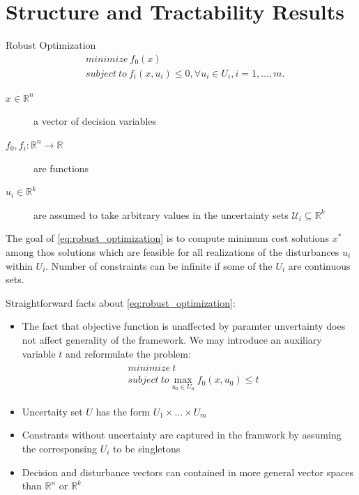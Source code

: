 \documentclass{beamer}
\begin{document}
\section{Structure and Tractability Results}

\begin{frame}{Robust Optimization}
\begin{align}
\label{eq:robust_optimization}
& minimize~f_0(x) \\
& subject~to~f_i(x,u_i) \leq 0, \forall u_i \in U_i, i = 1,\dots,m.
\end{align}
\begin{description}
\item [$x \in \mathbb{R}^n$] a vector of decision variables
\item [$f_0,f_i : \mathbb{R}^n \rightarrow \mathbb{R}$] are functions
\item [$u_i \in \mathbb{R}^k$] are assumed to take arbitrary values in the uncertainty sets $\mathcal{U}_i \subseteq \mathbb{R}^k$
\end{description}
The goal of \ref{eq:robust_optimization} is to compute minimum cost solutions $x^*$ among thos solutions which are feasible for all realizations of the disturbances $u_i$ within $U_i$.
Number of constraints can be infinite if some of the $U_i$ are continuous sets.
\end{frame}

\begin{frame}{}
Straightforward facts about \ref{eq:robust_optimization}:
\begin{itemize}
\item The fact that objective function is unaffected by paramter unvertainty does not affect generality of the framework. We may introduce an auxiliary variable $t$ and reformulate the problem:
\begin{align*}
\begin{split}
& minimize~t \\
& subject~to \max_{u_0 \in U_0} f_0(x, u_0) \leq t
\end{split}
\end{align*}
\item Uncertaity set $U$ has the form $U_1 \times \dots \times U_m$
\item Constrants without uncertainty are captured in the framwork by assuming the corresponsing $U_i$ to be singletons
\item Decision and disturbance vectors can contained in more general vector spaces than $\mathbb{R}^n$ or $\mathbb{R}^k$ 
\end{itemize}
\end{frame}
\end{document}
